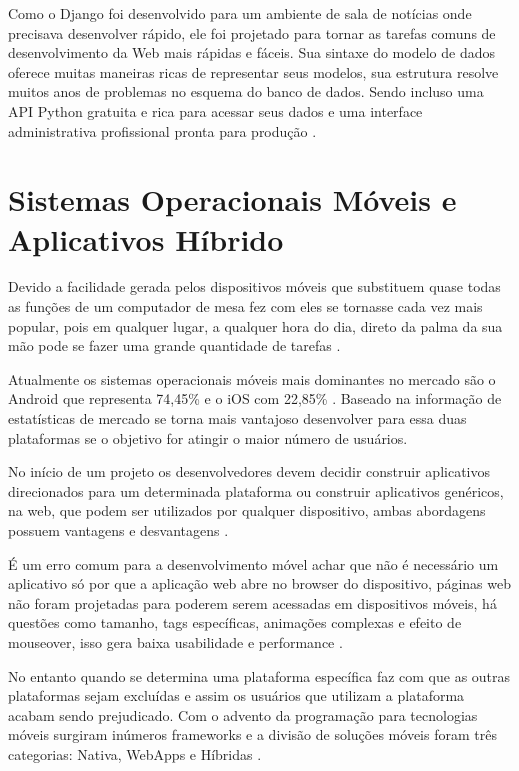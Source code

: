 \documentclass{ifto-tex}
\begin{document}
Como o Django foi desenvolvido para um ambiente de sala de notícias onde precisava desenvolver rápido, ele foi projetado para tornar as tarefas comuns de desenvolvimento da Web mais rápidas e fáceis. Sua sintaxe do modelo de dados oferece muitas maneiras ricas de representar seus modelos, sua estrutura resolve muitos anos de problemas no esquema do banco de dados. Sendo incluso uma API Python gratuita e rica para acessar seus dados e uma interface administrativa profissional pronta para produção \cite{Djangoem92:online}.

	
	\section{Sistemas Operacionais Móveis e Aplicativos Híbrido}
	Devido a facilidade gerada pelos dispositivos móveis que substituem quase todas as funções de um computador de mesa fez com eles se tornasse cada vez mais popular, pois em qualquer lugar, a qualquer hora do dia, direto da palma da sua mão pode se fazer uma grande quantidade de tarefas \cite{Sistemas41:online}.
	
	Atualmente os sistemas operacionais móveis mais dominantes no mercado são o Android que representa 74,45\% e o iOS com 22,85\% \cite{iOSvsAnd26:online}. Baseado na informação de estatísticas de mercado se torna mais vantajoso desenvolver para essa duas plataformas se o objetivo for atingir o maior número de usuários.
	
	No início de um projeto os desenvolvedores devem decidir construir aplicativos direcionados para um determinada plataforma ou construir aplicativos genéricos, na web, que podem ser utilizados por qualquer dispositivo, ambas abordagens possuem vantagens e desvantagens \cite{Aplicaco50:online}.
	
	É um erro comum para a desenvolvimento móvel achar que não é necessário um aplicativo só por que a aplicação web abre no browser do dispositivo, páginas web não foram projetadas para poderem serem acessadas em dispositivos móveis, há questões como tamanho, tags específicas, animações complexas e efeito de mouseover, isso gera baixa usabilidade e performance \cite{Introduc9:online}.
	
	No entanto quando se determina uma plataforma específica faz com que as outras plataformas sejam excluídas e assim os usuários que utilizam a plataforma acabam sendo prejudicado.
	Com o advento da programação para tecnologias móveis surgiram inúmeros frameworks e a divisão de soluções móveis foram três categorias: Nativa, WebApps e Híbridas \cite{Desenvol53:online}.
	
\end{document}
